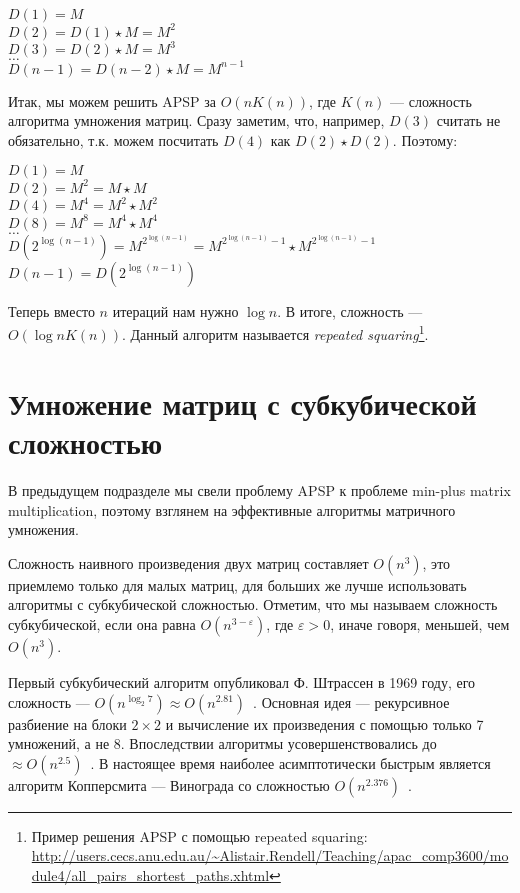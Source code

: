 \begin{center}
    $D(1) = M$ \\
    $D(2) = D(1) \star M = M^2$ \\
    $D(3) = D(2) \star M = M^3$ \\
    $\dots$ \\
    $D(n-1) = D(n-2) \star M = M^{n-1}$ \\
\end{center}

Итак, мы можем решить APSP за $O(n K(n))$, где $K(n)$ --- сложность алгоритма умножения матриц.
Сразу заметим, что, например, $D(3)$ считать не обязательно, т.к. можем посчитать $D(4)$ как $D(2) \star D(2)$.
Поэтому:

\begin{center}
    $D(1) = M$ \\
    $D(2) = M^2 = M \star M$ \\
    $D(4) = M^4 = M^2 \star M^2$ \\
    $D(8) = M^8 = M^4 \star M^4$ \\
    $\dots$ \\
    $D(2^{\log(n-1)}) = M^{2^{\log(n-1)}} = M^{2^{\log(n-1)} - 1} \star M^{2^{\log(n-1)} - 1}$ \\
    $D(n-1) = D(2^{\log(n-1)})$ \\
\end{center}

Теперь вместо $n$ итераций нам нужно $\log{n}$. В итоге, сложность --- $O(\log{n} K(n))$.
Данный алгоритм называется \textit{repeated squaring}\footnote{Пример решения APSP с помощью repeated squaring: \url{http://users.cecs.anu.edu.au/~Alistair.Rendell/Teaching/apac_comp3600/module4/all_pairs_shortest_paths.xhtml}}.

\section{Умножение матриц с субкубической сложностью}
В предыдущем подразделе мы свели проблему APSP к проблеме min-plus matrix multiplication, поэтому взглянем на эффективные алгоритмы матричного умножения.

Сложность наивного произведения двух матриц составляет $O(n^3)$, это приемлемо только для малых матриц, для больших же лучше использовать алгоритмы с субкубической сложностью.
Отметим, что мы называем сложность субкубической, если она равна $O(n^{3-\varepsilon})$, где $\varepsilon > 0$, иначе говоря, меньшей, чем $O(n^3)$.

Первый субкубический алгоритм опубликовал Ф. Штрассен в 1969 году, его сложность --- $O(n^{\log_2 7}) \approx O(n^{2.81})$~\cite{Strassen1969}. Основная идея --- рекурсивное разбиение на блоки $2 \times 2$ и вычисление их произведения с помощью только 7 умножений, а не 8.
Впоследствии алгоритмы усовершенствовались до ${\approx} O(n^{2.5})$~\cite{Pan1978,BiniCapoRoma1979,Schonhage1981,CoppWino1982}. В настоящее время наиболее асимптотически быстрым является алгоритм Копперсмита --- Винограда со сложностью $O(n^{2.376})$~\cite{CoppWino1990}.

